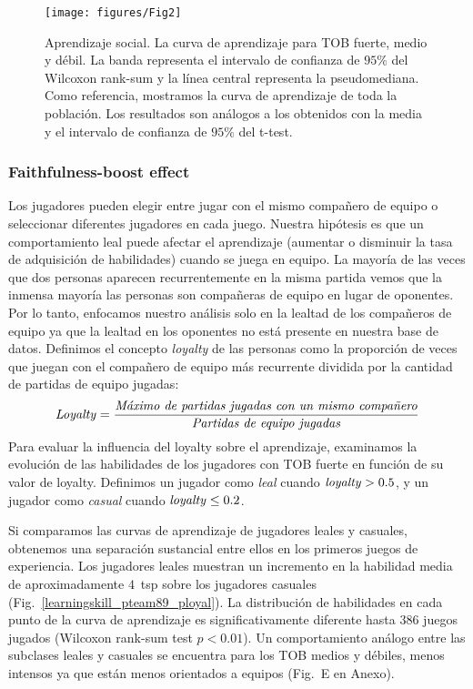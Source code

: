 \documentclass[a4paper,10pt]{book}
\theoremstyle{definition}
\begin{document}
\begin{figure}[ht!]
\centering
\texttt{[image: figures/Fig2]}
\caption{
Aprendizaje social.
%
La curva de aprendizaje para TOB fuerte, medio y débil.
%
La banda representa el intervalo de confianza de $95\%$ del Wilcoxon rank-sum y la línea central representa la pseudomediana.
%
Como referencia, mostramos la curva de aprendizaje de toda la población.
%
Los resultados son análogos a los obtenidos con la media y el intervalo de confianza de $95\%$ del t-test.
}
\label{learningskill_team_hasta4team}
\end{figure}


\subsubsection{Faithfulness-boost effect}

Los jugadores pueden elegir entre jugar con el mismo compañero de equipo o seleccionar diferentes jugadores en cada juego.
%
Nuestra hipótesis es que un comportamiento leal puede afectar el aprendizaje (aumentar o disminuir la tasa de adquisición de habilidades) cuando se juega en equipo.
%
La mayoría de las veces que dos personas aparecen recurrentemente en la misma partida vemos que la inmensa mayoría las personas son compañeras de equipo en lugar de oponentes.
%
Por lo tanto, enfocamos nuestro análisis solo en la lealtad de los compañeros de equipo ya que la lealtad en los oponentes no está presente en nuestra base de datos.
%
Definimos el concepto \emph{loyalty} de las personas como la proporción de veces que juegan con el compañero de equipo más recurrente dividida por la cantidad de partidas de equipo jugadas:
%
\begin{equation}
\text{\emph{Loyalty}} = \frac{\text{\emph{Máximo de partidas jugadas con un mismo compañero}}}{\text{\emph{Partidas de equipo jugadas}}}
\end{equation}
%
Para evaluar la influencia del loyalty sobre el aprendizaje, examinamos la evolución de las habilidades de los jugadores con TOB fuerte en función de su valor de loyalty.
%
Definimos un jugador como \emph{leal} cuando $\text{\emph{loyalty}}>0.5$, y un jugador como \emph{casual} cuando $\text{\emph{loyalty}}\leq 0.2$.


Si comparamos las curvas de aprendizaje de jugadores leales y casuales, obtenemos una separación sustancial entre ellos en los primeros juegos de experiencia.
%
Los jugadores leales muestran un incremento en la habilidad media de aproximadamente $4$~tsp sobre los jugadores casuales (Fig.~\ref{learningskill_pteam89_ployal}).
%
La distribución de habilidades en cada punto de la curva de aprendizaje es significativamente diferente hasta $386$ juegos jugados (Wilcoxon rank-sum test $p<0.01$).
%
Un comportamiento análogo entre las subclases leales y casuales se encuentra para los TOB medios y débiles, menos intensos ya que están menos orientados a equipos (Fig.~E en Anexo).
\end{document}
